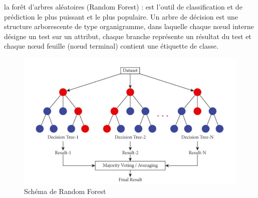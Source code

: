 \documentclass[a4paper,12pt]{report}
\begin{document}
\textcolor{colortxt}{la forêt d’arbres aléatoires (Random Forest) :}
\noindent \normalsize est l'outil de classification et de prédiction le plus puissant et le plus populaire. Un arbre de décision est une structure arborescente de type organigramme, dans laquelle chaque nœud interne désigne un test sur un attribut, chaque branche représente un résultat du test et chaque nœud feuille (nœud terminal) contient une étiquette de classe.
\begin{figure}[H]
\centering
 \includegraphics[scale=0.9]{outils-images/data15.png}
\caption{Schéma de Random Forest}
\end{figure}
\end{document}
